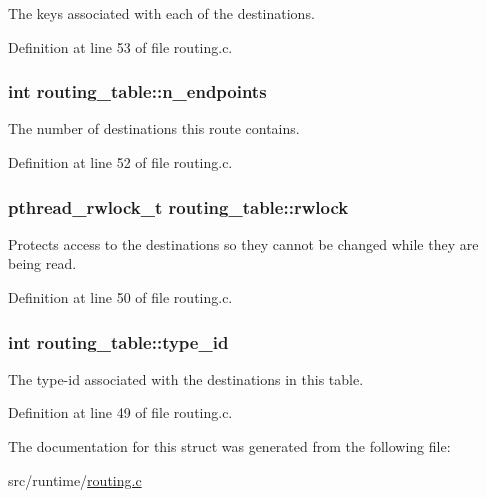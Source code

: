 The keys associated with each of the destinations. 



Definition at line 53 of file routing.\-c.

\hypertarget{structrouting__table_a7d9a6d626a79a44bb58533c97ac9e7ce}{
\subsubsection[{n\-\_\-endpoints}]{\setlength{\rightskip}{0pt plus 5cm}int routing\-\_\-table\-::n\-\_\-endpoints}}\label{structrouting__table_a7d9a6d626a79a44bb58533c97ac9e7ce}


The number of destinations this route contains. 



Definition at line 52 of file routing.\-c.

\hypertarget{structrouting__table_acbdb86bbcf769654f18ad6b2bb6c61c4}{
\subsubsection[{rwlock}]{\setlength{\rightskip}{0pt plus 5cm}pthread\-\_\-rwlock\-\_\-t routing\-\_\-table\-::rwlock}}\label{structrouting__table_acbdb86bbcf769654f18ad6b2bb6c61c4}


Protects access to the destinations so they cannot be changed while they are being read. 



Definition at line 50 of file routing.\-c.

\hypertarget{structrouting__table_a439ad2d1ec8a9d942bc3db95b02ea1a0}{
\subsubsection[{type\-\_\-id}]{\setlength{\rightskip}{0pt plus 5cm}int routing\-\_\-table\-::type\-\_\-id}}\label{structrouting__table_a439ad2d1ec8a9d942bc3db95b02ea1a0}


The type-\/id associated with the destinations in this table. 



Definition at line 49 of file routing.\-c.



The documentation for this struct was generated from the following file\-:\begin{DoxyCompactItemize}
\item 
src/runtime/\hyperlink{routing_8c}{routing.\-c}\end{DoxyCompactItemize}
